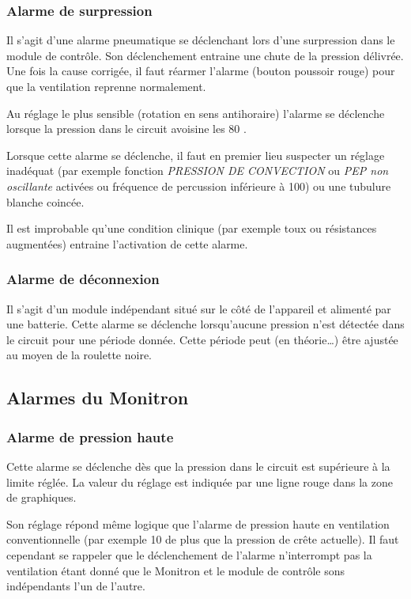 \subsubsection{Alarme de surpression}

Il s'agit d'une alarme pneumatique se déclenchant lors d'une surpression
dans le module de contrôle. Son déclenchement entraine une chute de la
pression délivrée. Une fois la cause corrigée, il faut réarmer l'alarme
(bouton poussoir rouge) pour que la ventilation reprenne normalement.

Au réglage le plus sensible (rotation en sens antihoraire) l'alarme se
déclenche lorsque la pression dans le circuit avoisine les 80 \cmh.

Lorsque cette alarme se déclenche, il faut en premier lieu suspecter un
réglage inadéquat (par exemple fonction \emph{PRESSION DE CONVECTION} ou
\emph{PEP non oscillante} activées ou fréquence de percussion inférieure
à 100) ou une tubulure blanche coincée.

Il est improbable qu'une condition clinique (par exemple toux ou
résistances augmentées) entraine l'activation de cette alarme.

\subsubsection{Alarme de déconnexion}

Il s'agit d'un module indépendant situé sur le côté de l'appareil et
alimenté par une batterie. Cette alarme se déclenche lorsqu'aucune
pression n'est détectée dans le circuit pour une période donnée. Cette
période peut (en théorie\ldots{}) être ajustée au moyen de la roulette
noire.

\subsection{Alarmes du Monitron}

\subsubsection*{Alarme de pression haute}%

Cette alarme se déclenche dès que la pression dans le circuit est
supérieure à la limite réglée. La valeur du réglage est indiquée par une
ligne rouge dans la zone de graphiques.

Son réglage répond même logique que l'alarme de pression haute en
ventilation conventionnelle (par exemple 10 \cmh de plus que la
pression de crête actuelle). Il faut cependant se rappeler que le
déclenchement de l'alarme n'interrompt pas la ventilation étant donné
que le Monitron et le module de contrôle sons indépendants l'un de
l'autre.

